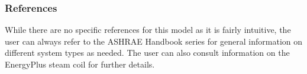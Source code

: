 \subsubsection{References}\label{references-1-007}

While there are no specific references for this model as it is fairly intuitive, the user can always refer to the ASHRAE Handbook series for general information on different system types as needed. The user can also consult information on the EnergyPlus steam coil for further details.
